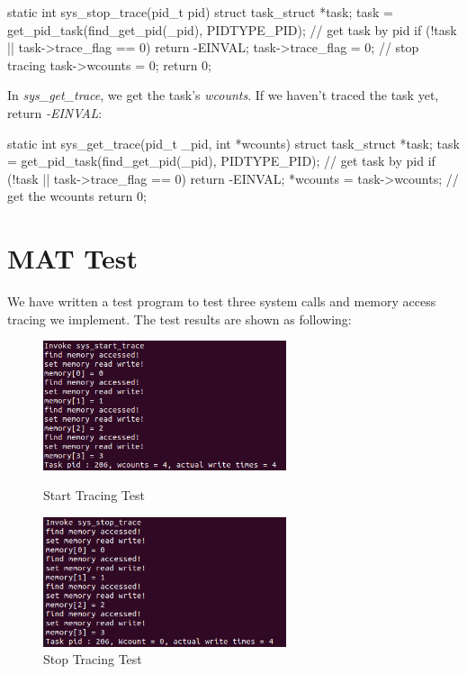 \begin{codeblock}[language=C]
static int sys_stop_trace(pid_t pid)
{
    struct task_struct *task;
    task = get_pid_task(find_get_pid(_pid), PIDTYPE_PID); // get task by pid
    if (!task || task->trace_flag == 0)
        return -EINVAL;
    task->trace_flag = 0; // stop tracing
    task->wcounts = 0;
    return 0;
}
\end{codeblock}

In \textit{sys\_get\_trace}, we get the task's \textit{wcounts}. If we haven't traced the task yet, return \textit{-EINVAL}:

\begin{codeblock}[language=C]
static int sys_get_trace(pid_t _pid, int *wcounts)
{
    struct task_struct *task;
    task = get_pid_task(find_get_pid(_pid), PIDTYPE_PID); // get task by pid
    if (!task || task->trace_flag == 0)
        return -EINVAL;
    *wcounts = task->wcounts; // get the wcounts
    return 0;
}
\end{codeblock}

\section{MAT Test}

We have written a test program to test three system calls and memory access tracing we implement. The test results are shown as following:

\begin{figure}[!htp]
\begin{minipage}{0.48\textwidth}
  \centering
  \includegraphics[height=3.8cm]{figures/mattest1.png}
  \caption{Start Tracing Test}
  \label{fig:memtest1}
\end{minipage}\hfill
\begin{minipage}{0.48\textwidth}
  \centering
  \includegraphics[height=3.8cm]{figures/mattest2.png}
  \caption{Stop Tracing Test}
  \label{fig:memtest2}
\end{minipage}
\end{figure}

